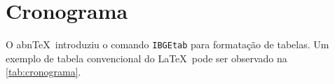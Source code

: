 \documentclass[
    12pt,                   %
    openright,              %
    oneside,                %
    a4paper,                %
    sumario=tradicional,    %
    english,                %
    brazil,                 %
    ]{abntex2}
\begin{document}





\chapter{Cronograma}\label{sec:cronograma}
O abn\TeX\ introduziu o comando \texttt{IBGEtab} para formatação de tabelas. Um exemplo de tabela convencional do \LaTeX\ pode ser observado na \autoref{tab:cronograma}.
\end{document}
